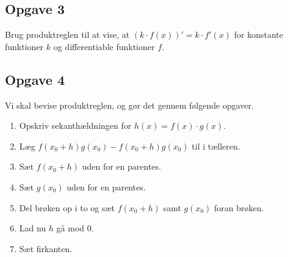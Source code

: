 \subsection*{Opgave 3}
Brug produktreglen til at vise, at $(k\cdot f(x))' = k\cdot f'(x)$ for konstante funktioner $k$ og differentiable funktioner $f$. 

\subsection*{Opgave 4}

Vi skal bevise produktreglen, og gør det gennem følgende opgaver.
\begin{enumerate}[label=\roman*)]
	\item Opskriv sekanthældningen for $h(x) = f(x)\cdot g(x)$. 
	\item Læg $f(x_0 + h)g(x_0) - f(x_0 + h)g(x_0)$ til i tælleren. 
	\item Sæt $f(x_0 + h)$ uden for en parentes.
	\item Sæt $g(x_0)$ uden for en parentes.
	\item Del brøken op i to og sæt $f(x_0 + h)$ samt $g(x_0)$ foran brøken.
	\item Lad nu $h$ gå mod $0$.
	\item Sæt firkanten.
\end{enumerate}
 